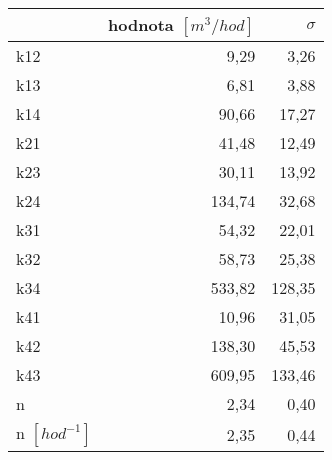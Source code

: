 \begin{tabular}{lrr}
\toprule
{} &  hodnota $\left[\si{m^3/hod}\right]$ &  $\sigma$ \\
\midrule
k12                 &                                 9,29 &      3,26 \\
k13                 &                                 6,81 &      3,88 \\
k14                 &                                90,66 &     17,27 \\
k21                 &                                41,48 &     12,49 \\
k23                 &                                30,11 &     13,92 \\
k24                 &                               134,74 &     32,68 \\
k31                 &                                54,32 &     22,01 \\
k32                 &                                58,73 &     25,38 \\
k34                 &                               533,82 &    128,35 \\
k41                 &                                10,96 &     31,05 \\
k42                 &                               138,30 &     45,53 \\
k43                 &                               609,95 &    133,46 \\
n                   &                                 2,34 &      0,40 \\
n $[\si{hod^{-1}}]$ &                                 2,35 &      0,44 \\
\bottomrule
\end{tabular}
